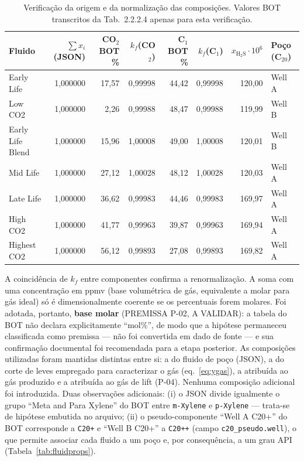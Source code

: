 \documentclass[11pt,a4paper]{article}
\numberwithin{equation}{section}
\numberwithin{table}{section}
\numberwithin{figure}{section}
\newcommand{\tipo}[1]{\textsf{\footnotesize #1}}
\newcommand{\AV}{\textcolor{red!70!black}{\tipo{A VALIDAR}}}
\begin{document}
\begin{table}[htbp]\centering\small
\caption{Verificação da origem e da normalização das composições. Valores BOT transcritos da Tab.~2.2.2.4 apenas para esta verificação.}\label{tab:norm}
\begin{tabular}{lrrrrrrl}\toprule
Fluido & $\sum x_i$ (JSON) & CO$_2$ BOT \% & $k_f$(CO$_2$) & C$_1$ BOT \% & $k_f$(C$_1$) & $x_{\mathrm{H_2S}}\cdot10^6$ & Poço (C$_{20}$)\\\midrule

Early Life & 1{,}000000 & 17{,}57 & 0{,}99998 & 44{,}42 & 0{,}99998 & 120{,}00 & Well A\\
Low CO2 & 1{,}000000 & 2{,}26 & 0{,}99988 & 48{,}47 & 0{,}99988 & 119{,}99 & Well B\\
Early Life Blend & 1{,}000000 & 15{,}96 & 1{,}00008 & 49{,}00 & 1{,}00008 & 120{,}01 & Well B\\
Mid Life & 1{,}000000 & 27{,}12 & 1{,}00028 & 48{,}12 & 1{,}00028 & 120{,}03 & Well A\\
Late Life & 1{,}000000 & 36{,}62 & 0{,}99983 & 44{,}46 & 0{,}99983 & 169{,}97 & Well A\\
High CO2 & 1{,}000000 & 41{,}77 & 0{,}99963 & 39{,}87 & 0{,}99963 & 169{,}94 & Well A\\
Highest CO2 & 1{,}000000 & 56{,}12 & 0{,}99893 & 27{,}08 & 0{,}99893 & 169{,}82 & Well A\\
\bottomrule\end{tabular}\end{table}
A coincidência de $k_f$ entre componentes confirma a renormalização. A soma com uma concentração em ppmv (base volumétrica de gás, equivalente a molar para gás ideal) só é dimensionalmente coerente se os percentuais forem molares. Foi adotada, portanto, \textbf{base molar} (PREMISSA P-02, \AV): a tabela do BOT não declara explicitamente ``mol\%'', de modo que a hipótese permaneceu classificada como premissa --- não foi convertida em dado de fonte --- e sua confirmação documental foi recomendada para a etapa posterior. As composições utilizadas foram mantidas distintas entre si: a do fluido de poço (JSON), a do corte de leves empregado para caracterizar o gás (eq.~\eqref{eq:ygas}), a atribuída ao gás produzido e a atribuída ao gás de lift (P-04). Nenhuma composição adicional foi introduzida. Duas observações adicionais: (i) o JSON divide igualmente o grupo ``Meta and Para Xylene'' do BOT entre \texttt{m-Xylene} e \texttt{p-Xylene} --- trata-se de hipótese embutida no arquivo; (ii) o pseudo-componente ``Well A C20+'' do BOT corresponde a \texttt{C20+} e ``Well B C20+'' a \texttt{C20++} (campo \texttt{c20\_pseudo.well}), o que permite associar cada fluido a um poço e, por consequência, a um grau API (Tabela~\ref{tab:fluidprops}).
\end{document}
